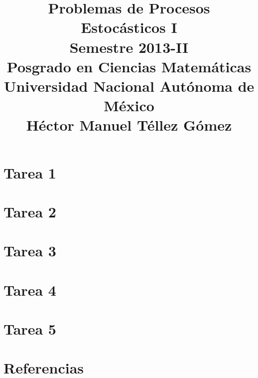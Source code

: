 \documentclass[a5paper,oneside]{amsart}
\title[Problemas de Procesos I]{
    Problemas de Procesos Estocásticos I\\ 
    Semestre 2013-II\\ 
    Posgrado en Ciencias Matemáticas\\ 
    Universidad Nacional Autónoma de México\\
    Héctor Manuel Téllez Gómez
}
\theoremstyle{definition}
\numberwithin{section}{part}
\numberwithin{equation}{subsection}
\begin{document}
    \maketitle
    \part{Tarea 1}
                
        \nqed
        
    \part{Tarea 2}
                
        \nqed
        
    \part{Tarea 3}
                
        \nqed
            
    \part{Tarea 4}
                
        \nqed    
    
    \part{Tarea 5}
                
        \nqed
        
    \part*{Referencias}
    
    
\end{document}
